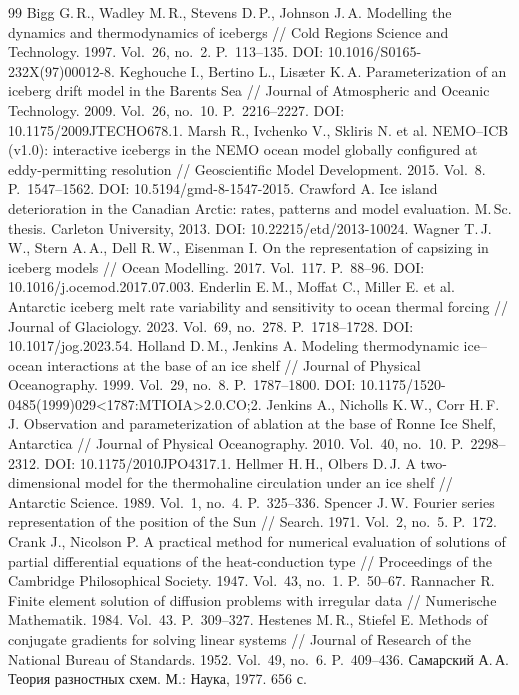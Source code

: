 \documentclass[12pt,a4paper]{article}
\begin{document}
\begin{thebibliography}{99}
 Bigg G.\,R., Wadley M.\,R., Stevens D.\,P., Johnson J.\,A. Modelling the dynamics and thermodynamics of icebergs // Cold Regions Science and Technology. 1997. Vol.~26, no.~2. P.~113--135. DOI: 10.1016/S0165-232X(97)00012-8.
 Keghouche I., Bertino L., Lisæter K.\,A. Parameterization of an iceberg drift model in the Barents Sea // Journal of Atmospheric and Oceanic Technology. 2009. Vol.~26, no.~10. P.~2216--2227. DOI: 10.1175/2009JTECHO678.1.
 Marsh R., Ivchenko V., Skliris N. et al. NEMO--ICB (v1.0): interactive icebergs in the NEMO ocean model globally configured at eddy-permitting resolution // Geoscientific Model Development. 2015. Vol.~8. P.~1547--1562. DOI: 10.5194/gmd-8-1547-2015.
 Crawford A. Ice island deterioration in the Canadian Arctic: rates, patterns and model evaluation. M.\,Sc. thesis. Carleton University, 2013. DOI: 10.22215/etd/2013-10024.
 Wagner T.\,J.\,W., Stern A.\,A., Dell R.\,W., Eisenman I. On the representation of capsizing in iceberg models // Ocean Modelling. 2017. Vol.~117. P.~88--96. DOI: 10.1016/j.ocemod.2017.07.003.
 Enderlin E.\,M., Moffat C., Miller E. et al. Antarctic iceberg melt rate variability and sensitivity to ocean thermal forcing // Journal of Glaciology. 2023. Vol.~69, no.~278. P.~1718--1728. DOI: 10.1017/jog.2023.54.
 Holland D.\,M., Jenkins A. Modeling thermodynamic ice--ocean interactions at the base of an ice shelf // Journal of Physical Oceanography. 1999. Vol.~29, no.~8. P.~1787--1800. DOI: 10.1175/1520-0485(1999)029<1787:MTIOIA>2.0.CO;2.
 Jenkins A., Nicholls K.\,W., Corr H.\,F.\,J. Observation and parameterization of ablation at the base of Ronne Ice Shelf, Antarctica // Journal of Physical Oceanography. 2010. Vol.~40, no.~10. P.~2298--2312. DOI: 10.1175/2010JPO4317.1.
 Hellmer H.\,H., Olbers D.\,J. A two-dimensional model for the thermohaline circulation under an ice shelf // Antarctic Science. 1989. Vol.~1, no.~4. P.~325--336.
 Spencer J.\,W. Fourier series representation of the position of the Sun // Search. 1971. Vol.~2, no.~5. P.~172.
 Crank J., Nicolson P. A practical method for numerical evaluation of solutions of partial differential equations of the heat-conduction type // Proceedings of the Cambridge Philosophical Society. 1947. Vol.~43, no.~1. P.~50--67.
 Rannacher R. Finite element solution of diffusion problems with irregular data // Numerische Mathematik. 1984. Vol.~43. P.~309--327.
 Hestenes M.\,R., Stiefel E. Methods of conjugate gradients for solving linear systems // Journal of Research of the National Bureau of Standards. 1952. Vol.~49, no.~6. P.~409--436.
 Самарский А.\,А. Теория разностных схем. М.: Наука, 1977. 656 с.
\end{thebibliography}
\end{document}
